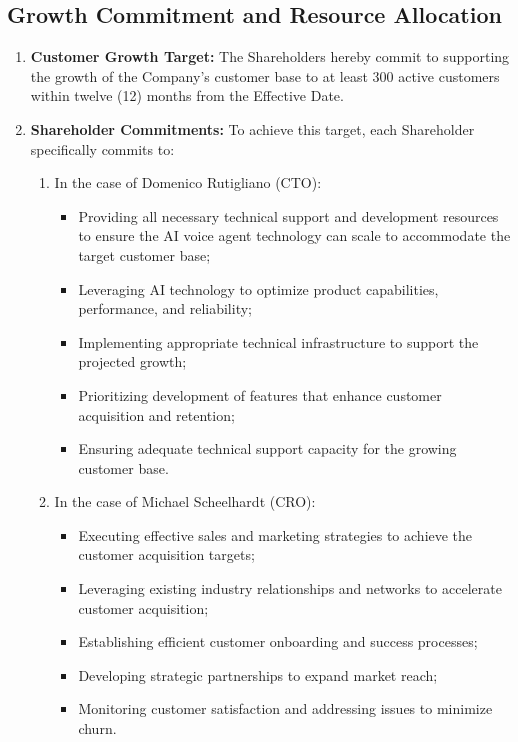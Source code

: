 \subsection{Growth Commitment and Resource Allocation}
\begin{enumerate}[label=(\alph*), wide, labelwidth=!, labelindent=0pt]
\item \textbf{Customer Growth Target:} The Shareholders hereby commit to supporting the growth of the Company's customer base to at least 300 active customers within twelve (12) months from the Effective Date.
\item \textbf{Shareholder Commitments:} To achieve this target, each Shareholder specifically commits to:
    \begin{enumerate}[label=(\roman*)]
    \item In the case of Domenico Rutigliano (CTO):
        \begin{itemize}
        \item Providing all necessary technical support and development resources to ensure the AI voice agent technology can scale to accommodate the target customer base;
        \item Leveraging AI technology to optimize product capabilities, performance, and reliability;
        \item Implementing appropriate technical infrastructure to support the projected growth;
        \item Prioritizing development of features that enhance customer acquisition and retention;
        \item Ensuring adequate technical support capacity for the growing customer base.
        \end{itemize}
    \item In the case of Michael Scheelhardt (CRO):
        \begin{itemize}
        \item Executing effective sales and marketing strategies to achieve the customer acquisition targets;
        \item Leveraging existing industry relationships and networks to accelerate customer acquisition;
        \item Establishing efficient customer onboarding and success processes;
        \item Developing strategic partnerships to expand market reach;
        \item Monitoring customer satisfaction and addressing issues to minimize churn.
        \end{itemize}

\end{enumerate}
\end{enumerate}
